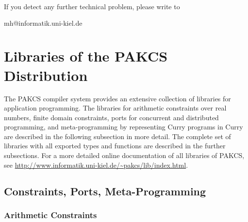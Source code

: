 \documentclass[11pt,fleqn]{article}
\renewcommand{\tt}{\usefont{OT1}{cmtt}{m}{n}\selectfont}
\newcommand{\codefont}{\tt}
\newcommand{\code}[1]{\mbox{\codefont #1}}
\begin{document}
If you detect any further technical problem,
please write to
\begin{center}
\code{mh@informatik.uni-kiel.de}
\end{center}

\newpage




\newpage
\appendix

\section{Libraries of the PAKCS Distribution}
\label{sec:libraries}

{\setlength{\parindent}{0.0cm}

The PAKCS compiler system provides an extensive collection
of libraries for application programming.
The libraries for arithmetic constraints over real numbers,
finite domain constraints,
ports for concurrent and distributed programming, and
meta-programming by representing Curry programs in Curry
are described in the following subsection in more detail.
The complete set of libraries with all exported types and functions
are described in the further subsections.
For a more detailed online documentation of all libraries of PAKCS,
see \url{http://www.informatik.uni-kiel.de/~pakcs/lib/index.html}.

\subsection{Constraints, Ports, Meta-Programming}

\subsubsection{Arithmetic Constraints}

}
\end{document}
